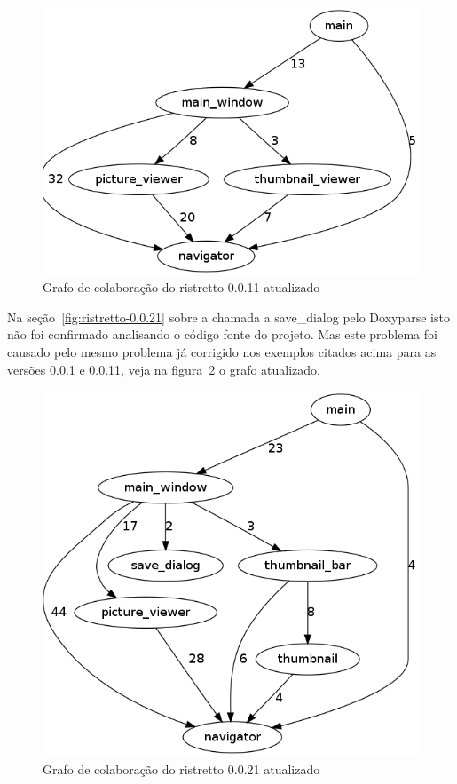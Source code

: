 \begin{figure}
\center
\includegraphics[scale=0.3]{imagens/ristretto-0_0_11-doxyparse-2}
\caption{Grafo de colaboração do ristretto 0.0.11 atualizado}
\label{fig:ristretto-0.0.11-doxyparse-2}
\end{figure}

Na seção~\ref{fig:ristretto-0.0.21} sobre a chamada a save\_dialog pelo Doxyparse isto não foi confirmado analisando o código fonte do projeto.
Mas este problema foi causado pelo mesmo problema já corrigido nos exemplos
citados acima para as versões 0.0.1 e 0.0.11, veja na
figura~\ref{fig:ristretto-0.0.21-doxyparse-2} o grafo atualizado.

\begin{figure}
\center
\includegraphics[scale=0.3]{imagens/ristretto-0_0_21-doxyparse-2}
\caption{Grafo de colaboração do ristretto 0.0.21 atualizado}
\label{fig:ristretto-0.0.21-doxyparse-2}
\end{figure}


